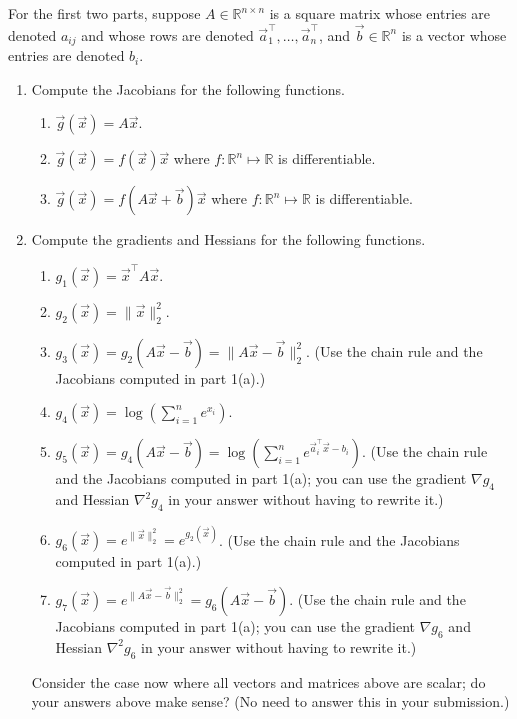 \documentclass[10pt]{article}
\theoremstyle{definition}
\theoremstyle{plain}
\newcommand{\RR}{\mathbb{R}}
\begin{document}
For the first two parts, suppose $A \in \RR^{n \times n}$ is a square matrix whose entries are denoted $a_{ij}$ and whose rows are denoted $\vec{a}_1^\top, \ldots, \vec{a}_n^\top$, and $\vec{b} \in \RR^n$ is a vector whose entries are denoted $b_i$.

\begin{enumerate}[label=(\alph*)]
\item Compute the Jacobians for the following functions.
\begin{enumerate}[label=\roman*.]
    \item $\vec{g}(\vec{x}) = A\vec{x}$.
    \item $\vec{g}(\vec{x}) = f(\vec{x})\vec{x}$ where $f : \RR^n \mapsto \RR$ is differentiable.
    \item $\vec{g}(\vec{x}) = f(A\vec{x} + \vec{b})\vec{x}$ where $f : \RR^n \mapsto \RR$ is differentiable.
\end{enumerate}

\item Compute the gradients and Hessians for the following functions.
\begin{enumerate}[label=\roman*.]
    \item $g_1(\vec{x}) = \vec{x}^\top A \vec{x}$.
    \item $g_2(\vec{x}) = \|\vec{x}\|_2^2$.
    \item $g_3(\vec{x}) = g_2(A\vec{x} - \vec{b}) = \|A\vec{x} - \vec{b}\|_2^2$. (Use the chain rule and the Jacobians computed in part 1(a).)
    \item $g_4(\vec{x}) = \log\!\left(\sum_{i=1}^n e^{x_i}\right)$.
    \item $g_5(\vec{x}) = g_4(A\vec{x} - \vec{b}) = \log\!\left(\sum_{i=1}^n e^{\vec{a}_i^\top \vec{x} - b_i}\right)$. (Use the chain rule and the Jacobians computed in part 1(a); you can use the gradient $\nabla g_4$ and Hessian $\nabla^2 g_4$ in your answer without having to rewrite it.)
    \item $g_6(\vec{x}) = e^{\|\vec{x}\|_2^2} = e^{g_2(\vec{x})}$. (Use the chain rule and the Jacobians computed in part 1(a).)
    \item $g_7(\vec{x}) = e^{\|A\vec{x} - \vec{b}\|_2^2} = g_6(A\vec{x} - \vec{b})$. (Use the chain rule and the Jacobians computed in part 1(a); you can use the gradient $\nabla g_6$ and Hessian $\nabla^2 g_6$ in your answer without having to rewrite it.)
\end{enumerate}

Consider the case now where all vectors and matrices above are scalar; do your answers above make sense? (No need to answer this in your submission.)


\end{enumerate}
\end{document}
